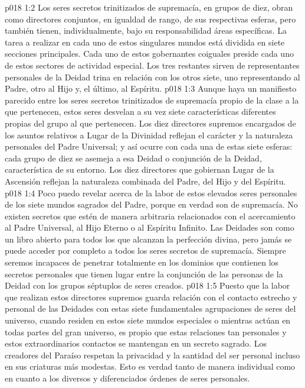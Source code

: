 \vs p018 1:2 Los seres secretos trinitizados de supremacía, en grupos de diez, obran como directores conjuntos, en igualdad de rango, de sus respectivas esferas, pero también tienen, individualmente, bajo su responsabilidad áreas específicas. La tarea a realizar en cada uno de estos singulares mundos está dividida en siete secciones principales. Cada uno de estos gobernantes coiguales preside cada uno de estos sectores de actividad especial. Los tres restantes sirven de representantes personales de la Deidad trina en relación con los otros siete, uno representando al Padre, otro al Hijo y, el último, al Espíritu.
\vs p018 1:3 Aunque haya un manifiesto parecido entre los seres secretos trinitizados de supremacía propio de la clase a la que pertenecen, estos seres desvelan a su vez siete características diferentes propias del grupo al que pertenecen. Los diez directores supremos encargados de los asuntos relativos a Lugar de la Divinidad reflejan el carácter y la naturaleza personales del Padre Universal; y así ocurre con cada una de estas siete esferas: cada grupo de diez se asemeja a esa Deidad o conjunción de la Deidad, característica de su entorno. Los diez directores que gobiernan Lugar de la Ascensión reflejan la naturaleza combinada del Padre, del Hijo y del Espíritu.
\vs p018 1:4 \pc Poco puedo revelar acerca de la labor de estos elevados seres personales de los siete mundos sagrados del Padre, porque en verdad son  de supremacía. No existen secretos que estén de manera arbitraria relacionados con el acercamiento al Padre Universal, al Hijo Eterno o al Espíritu Infinito. Las Deidades son como un libro abierto para todos los que alcanzan la perfección divina, pero jamás se puede acceder por completo a todos los seres secretos de supremacía. Siempre seremos incapaces de penetrar totalmente en los dominios que contienen los secretos personales que tienen lugar entre la conjunción de las personas de la Deidad con los grupos séptuplos de seres creados.
\vs p018 1:5 Puesto que la labor que realizan estos directores supremos guarda relación con el contacto estrecho y personal de las Deidades con estas siete fundamentales agrupaciones de seres del universo, cuando residen en estos siete mundos especiales o mientras actúan en todas partes del gran universo, es propio que estas relaciones tan personales y estos extraordinarios contactos se mantengan en un secreto sagrado. Los creadores del Paraíso respetan la privacidad y la santidad del ser personal incluso en sus criaturas más modestas. Esto es verdad tanto de manera individual como en cuanto a los diversos y diferenciados órdenes de seres personales.
